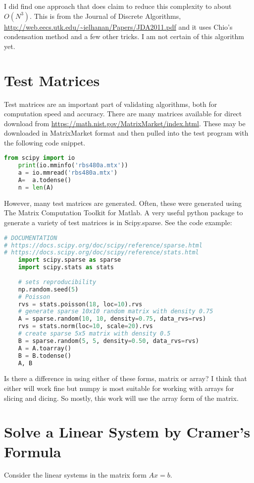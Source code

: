 \documentclass[12pt]{article}
\begin{document}
I did find one approach that does claim to reduce this complexity to about $O(N^3)$. This is from the Journal of Discrete Algorithms, \url{http://web.eecs.utk.edu/~ielhanan/Papers/JDA2011.pdf} and it uses Chio's condensation method and a few other tricks. I am not certain of this algorithm yet.



\section*{Test Matrices}
Test matrices are an important part of validating algorithms, both for computation speed and accuracy. There are many matrices available for direct download from \url{https://math.nist.gov/MatrixMarket/index.html}. These may be downloaded in MatrixMarket format and then pulled into the test program with the following code snippet.

\begin{lstlisting}[language=Python]
	from scipy import io
	print(io.mminfo('rbs480a.mtx'))
	a = io.mmread('rbs480a.mtx')
	A=  a.todense()
	n = len(A)
\end{lstlisting}

However, many test matrices are generated. Often, these were generated using The Matrix Computation Toolkit for Matlab. A very useful python package to generate a variety of test matrices is in Scipy.sparse. See the code example:

\begin{lstlisting}[language=Python]
# DOCUMENTATION
# https://docs.scipy.org/doc/scipy/reference/sparse.html
# https://docs.scipy.org/doc/scipy/reference/stats.html
	import scipy.sparse as sparse
	import scipy.stats as stats
	
	# sets reproducibility
	np.random.seed(5) 
	# Poisson
	rvs = stats.poisson(18, loc=10).rvs
	# generate sparse 10x10 random matrix with density 0.75
	A = sparse.random(10, 10, density=0.75, data_rvs=rvs)
	rvs = stats.norm(loc=10, scale=20).rvs
	# create sparse 5x5 matrix with density 0.5
	B = sparse.random(5, 5, density=0.50, data_rvs=rvs)
	A = A.toarray()
	B = B.todense()
	A, B
\end{lstlisting}

Is there a difference in using either of these forms, matrix or array? I think that either will work fine but numpy is most suitable for working with arrays for slicing and dicing. So mostly, this work will use the array form of the matrix.

\section*{Solve a Linear System by Cramer's Formula}
Consider the linear systems in the matrix form $Ax =b$.
\end{document}
